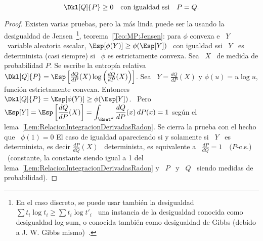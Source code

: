 \begin{lema}
\label{Lem:SZ:PositividadEntropiaRelativa}
%
  \[
  \Dkl[Q]{P} \ge 0 \quad \mbox{con igualdad ssi} \quad P = Q. %
  \]
\end{lema}
%
\begin{proof}
  Existen varias pruebas, pero la m\'as linda puede ser la usando la desigualdad
  de  Jensen~\footnote{En   el  caso  discreto,  se  puede   usar  tambi\'en  la
    desigualdad \ $\sum t_i \log t_i \ge  \sum t_i \log t'_i$ \ una instancia de
    la desigualdad conocida como  desigualdad log-sum, o conocida tambi\'en como
    desigualdad de  Gibbs (debido a J.  W.   Gibbs mismo)~\cite{Gib02, CovTho06,
      Rio07,         Mer10,        Mer18}.},        teorema~\ref{Teo:MP:Jensen}:
  para $\phi$ convexa  e \ $Y$ \ variable  aleatoria escalar, $\Esp[\phi(Y)] \ge
  \phi(\Esp[Y])$ \ con igualdad ssi \  $Y$ \ es determinista (casi siempre) si \
  $\phi$ es estrictamente  convexa.  Sea \ $X$ \ de  medida de probabilidad $P$.
  Se escribe la entrop\'ia  relativa \ $\Dkl[Q]{P} = \Esp\left[ \frac{dQ}{dP}(X)
    \log \left( \frac{dQ}{dP}(X) \right) \right]$.  Sea \ $Y = \frac{dQ}{dP}(X)$
  y  $\phi(u)  =  u  \log  u$,  funci\'on  estrictamente  convexa.   Entonces  \
  $\Dkl[Q]{P}  =  \Esp[\phi(Y)] \ge  \phi(\Esp[Y])$.   \  Pero \  $\displaystyle
  \Esp[Y]    =   \Esp\left[    \frac{dQ}{dP}(X)    \right]   =    \int_{\Rset^d}
  \frac{dQ}{dP}(x)       \,       dP(x)        =       1$       seg\'un       el
  lema~\ref{Lem:RelacionIntegracionDerivadasRadon}.
  Se cierra  la prueba  con el hecho  que \  $\phi(1) = 0$  El caso  de igualdad
  apareciendo  si   y  solamente   si  \  $Y$   \  es  determinista,   es  decir
  $\frac{dP}{dQ}(X)$ \ determinista, es equivalente a \ $\frac{dP}{dQ} = 1 \quad
  (P$-c.s.)    \    (constante,   la   constante   siendo   igual    a   1   del
  lema~\ref{Lem:RelacionIntegracionDerivadasRadon} y  \ $P$ \  y \ $Q$  \ siendo
  medidas de probabilidad).
\end{proof}

